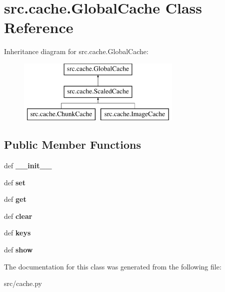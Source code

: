 \hypertarget{classsrc_1_1cache_1_1_global_cache}{\section{src.\-cache.\-Global\-Cache \-Class \-Reference}
\label{classsrc_1_1cache_1_1_global_cache}
}
\-Inheritance diagram for src.\-cache.\-Global\-Cache\-:\begin{figure}[H]
\begin{center}
\leavevmode
\includegraphics[height=3.000000cm]{classsrc_1_1cache_1_1_global_cache}
\end{center}
\end{figure}
\subsection*{\-Public \-Member \-Functions}
\begin{DoxyCompactItemize}
\item 
\hypertarget{classsrc_1_1cache_1_1_global_cache_a26b9a187ede599cf55297aab7208f981}{def {\bfseries \-\_\-\-\_\-init\-\_\-\-\_\-}}\label{classsrc_1_1cache_1_1_global_cache_a26b9a187ede599cf55297aab7208f981}

\item 
\hypertarget{classsrc_1_1cache_1_1_global_cache_a91b5d25a33c154754522d190e7e2718a}{def {\bfseries set}}\label{classsrc_1_1cache_1_1_global_cache_a91b5d25a33c154754522d190e7e2718a}

\item 
\hypertarget{classsrc_1_1cache_1_1_global_cache_af24bf67dfcc37a22c6e116ed76d0ee4b}{def {\bfseries get}}\label{classsrc_1_1cache_1_1_global_cache_af24bf67dfcc37a22c6e116ed76d0ee4b}

\item 
\hypertarget{classsrc_1_1cache_1_1_global_cache_a76080238d27ef753f9770c925d73e673}{def {\bfseries clear}}\label{classsrc_1_1cache_1_1_global_cache_a76080238d27ef753f9770c925d73e673}

\item 
\hypertarget{classsrc_1_1cache_1_1_global_cache_a174b418100a2fb9f93af51f7c27d7ac3}{def {\bfseries keys}}\label{classsrc_1_1cache_1_1_global_cache_a174b418100a2fb9f93af51f7c27d7ac3}

\item 
\hypertarget{classsrc_1_1cache_1_1_global_cache_a992de506d9990f2307ccd73600ae5aa1}{def {\bfseries show}}\label{classsrc_1_1cache_1_1_global_cache_a992de506d9990f2307ccd73600ae5aa1}

\end{DoxyCompactItemize}


\-The documentation for this class was generated from the following file\-:\begin{DoxyCompactItemize}
\item 
src/cache.\-py\end{DoxyCompactItemize}
